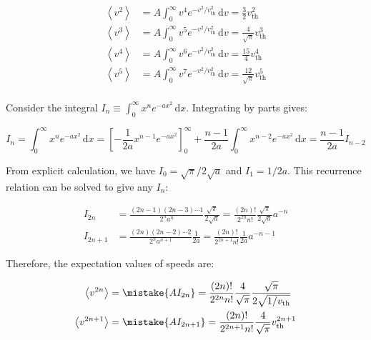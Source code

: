 \documentclass[12pt]{article}
\begin{document}

\begin{equation}
    \begin{split}
        \left\langle v^{2} \right\rangle &= A \int_{0}^{\infty} v^{4} e^{-v^{2}/v_{\text{th}}^{2}} \, \mathrm{d}v = \frac{3}{2} v_{\text{th}}^{2} \\
        \left\langle v^{3} \right\rangle &= A \int_{0}^{\infty} v^{5} e^{-v^{2}/v_{\text{th}}^{2}} \, \mathrm{d}v = \frac{4}{\sqrt{\pi}} v_{\text{th}}^{3} \\
        \left\langle v^{4} \right\rangle &= A \int_{0}^{\infty} v^{6} e^{-v^{2}/v_{\text{th}}^{2}} \, \mathrm{d}v = \frac{15}{4} v_{\text{th}}^{4} \\
        \left\langle v^{5} \right\rangle &= A \int_{0}^{\infty} v^{7} e^{-v^{2}/v_{\text{th}}^{2}} \, \mathrm{d}v = \frac{12}{\sqrt{\pi}} v_{\text{th}}^{5} \\
    \end{split}
\end{equation}

Consider the integral $I_{n} \equiv \int_{0}^{\infty} x^{n} e^{-ax^{2}} \, \mathrm{d}x$. Integrating by parts gives:

\begin{equation}
    I_{n} = \int_{0}^{\infty} x^{n} e^{-ax^{2}} \, \mathrm{d}x = \left[ -\frac{1}{2a} x^{n-1} e^{-ax^{2}} \right]_{0}^{\infty} + \frac{n-1}{2a} \int_{0}^{\infty} x^{n-2} e^{-ax^{2}} \, \mathrm{d}x = \frac{n-1}{2a} I_{n-2}
\end{equation}

From explicit calculation, we have $I_{0} = \sqrt{\pi}/2\sqrt{a}$ and $I_{1} = 1/2a$. This recurrence relation can be solved to give any $I_{n}$:

\begin{equation}
    \begin{split}
        I_{2n} &= \frac{(2n-1)(2n-3)\cdots 1}{2^{n} a^{n}} \frac{\sqrt{\pi}}{2\sqrt{a}} = \frac{(2n)!}{2^{2n} n!} \frac{\sqrt{\pi}}{2\sqrt{a}} a^{-n} \\
        I_{2n+1} &= \frac{(2n)(2n-2)\cdots 2}{2^{n} a^{n+1}} \frac{1}{2a} = \frac{(2n)!}{2^{2n+1} n!} \frac{1}{2a} a^{-n-1}
    \end{split}
\end{equation}

Therefore, the expectation values of speeds are:

\begin{equation}
    \begin{split}
        \left\langle v^{2n} \right\rangle &= \mistake{A I_{2n}} = \frac{(2n)!}{2^{2n} n!} \frac{4}{\sqrt{\pi}} \frac{\sqrt{\pi}}{2\sqrt{1/v_{\text{th}}}} \\
        \left\langle v^{2n+1} \right\rangle &= \mistake{A I_{2n+1}} = \frac{(2n)!}{2^{2n+1} n!} \frac{4}{\sqrt{\pi}} v_{\text{th}}^{2n+1}
    \end{split}
\end{equation}
\end{document}
